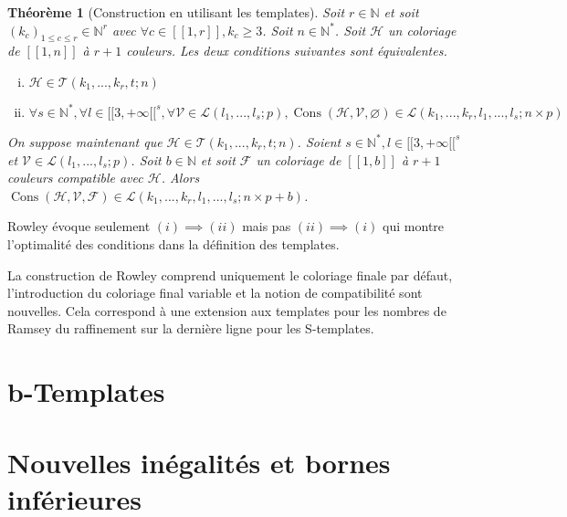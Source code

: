 \documentclass{article}
\newtheorem{theorem}[definition]{Théorème}
\DeclareMathOperator{\cons}{Cons}
\begin{document}
\begin{theorem}[Construction en utilisant les templates]
Soit \(r \in \mathbb{N}\) et soit \((k_c)_{1 \leqslant c \leqslant r} \in \mathbb{N}^r\) avec \(\forall c \in [\![1,r]\!], k_c \geqslant 3\). Soit \(n \in \mathbb{N}^*\). Soit \(\mathcal{H}\) un coloriage de \([\![1,n]\!]\) à \(r + 1\) couleurs. Les deux conditions suivantes sont équivalentes.

\begin{enumerate}[(i)]
\item \(\mathcal{H} \in \mathcal{T}(k_1, ..., k_r, t; n)\)
\item \(\forall s \in \mathbb{N}^*, \forall l \in {[\![3, +\infty[\![}^s, \forall \mathcal{V} \in \mathcal{L}(l_1, ..., l_s ; p), \cons(\mathcal{H}, \mathcal{V}, \varnothing) \in  \mathcal{L}(k_1, ..., k_r, l_1, ..., l_s ; n \times p)\)
\end{enumerate}

On suppose maintenant que \(\mathcal{H} \in \mathcal{T}(k_1, ..., k_r, t; n)\). Soient \(s \in \mathbb{N}^*, l \in [\![3, +\infty[\![^s\) et \(\mathcal{V} \in \mathcal{L}(l_1, ..., l_s ; p)\). Soit \(b \in \mathbb{N}\) et soit \(\mathcal{F}\) un coloriage de \([\![1, b]\!]\) à \(r + 1\) couleurs compatible avec \(\mathcal{H}\). Alors \(\cons(\mathcal{H}, \mathcal{V}, \mathcal{F}) \in  \mathcal{L}(k_1, ..., k_r, l_1, ..., l_s ; n \times p + b)\).
\end{theorem}

Rowley évoque seulement \((i) \implies (ii)\) mais pas \((ii) \implies (i)\) qui montre l'optimalité des conditions dans la définition des templates.

La construction de Rowley comprend uniquement le coloriage finale par défaut, l'introduction du coloriage final variable et la notion de compatibilité sont nouvelles. Cela correspond à une extension aux templates pour les nombres de Ramsey du raffinement sur la dernière ligne pour les S-templates.
\section{b-Templates}
\label{sec:b-temp}

\section{Nouvelles inégalités et bornes inférieures}
\label{sec:results}



\end{document}

